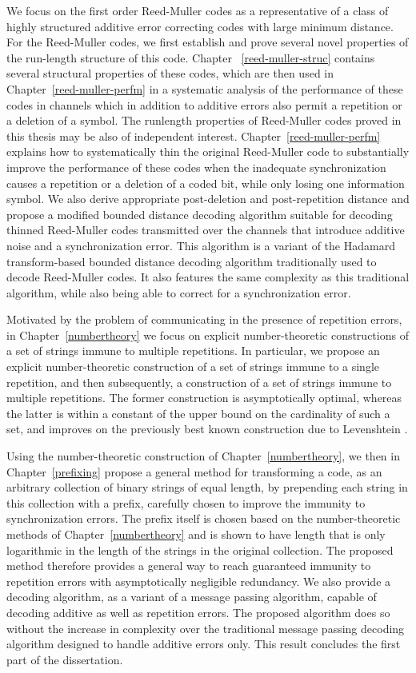 We focus on the first order Reed-Muller codes as a representative of
a class of highly structured additive error correcting codes with
large minimum distance. For the Reed-Muller codes, we first
establish and prove several novel properties of the run-length
structure of this code. Chapter ~\ref{reed-muller-struc} contains
several structural properties of these codes, which are then used in
Chapter~\ref{reed-muller-perfm} in a systematic analysis of the
performance of these codes in channels which in addition to additive
errors also permit a repetition or a deletion of a symbol. The
runlength properties of Reed-Muller codes proved in this thesis may
be also of independent interest. Chapter~\ref{reed-muller-perfm}
explains how to systematically thin the original Reed-Muller code to
substantially improve the performance of these codes when the
inadequate synchronization causes a repetition or a deletion of a
coded bit, while only losing one information symbol. We also derive
appropriate post-deletion and post-repetition distance and propose a
modified bounded distance decoding algorithm suitable for decoding
thinned Reed-Muller codes transmitted over the channels that
introduce additive noise and a synchronization error. This algorithm
is a variant of the Hadamard transform-based bounded distance
decoding algorithm traditionally used to decode Reed-Muller codes.
It also features the same complexity as this traditional algorithm,
while also being able to correct for a synchronization error.

Motivated by the problem of communicating in the presence of
repetition errors, in Chapter~\ref{numbertheory} we focus on
explicit number-theoretic constructions of a set of strings immune
to multiple repetitions. In particular, we propose an explicit
number-theoretic construction of a set of strings immune to a single
repetition, and then subsequently, a construction of a set of
strings immune to multiple repetitions. The former construction is
asymptotically optimal, whereas the latter is within a constant of
the upper bound on the cardinality of such a set, and improves on
the previously best known construction due to Levenshtein
\cite{lev:66a}.

Using the number-theoretic construction of
Chapter~\ref{numbertheory}, we then in Chapter~\ref{prefixing}
propose a general method for transforming a code, as an arbitrary
collection of binary strings of equal length, by prepending each
string in this collection with a  prefix, carefully chosen to
improve the immunity to synchronization errors. The prefix itself is
chosen based on the number-theoretic methods of
Chapter~\ref{numbertheory} and is shown to have length that is only
logarithmic in the length of the strings in the original collection.
The proposed method therefore provides a general way to reach
guaranteed immunity to repetition errors with asymptotically
negligible redundancy. We also provide a decoding algorithm, as a
variant of a message passing algorithm, capable of decoding additive
as well as repetition errors. The proposed algorithm does so without
the increase in complexity over the traditional message passing
decoding algorithm designed to handle additive errors only. This
result concludes the first part of the dissertation.


